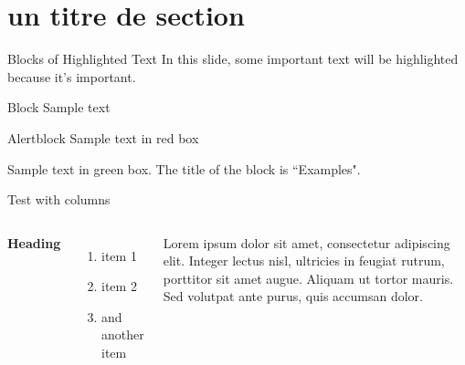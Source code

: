 \documentclass[aspectratio=169,xcolor=dvipsnames, t]{beamer}
\begin{document}
\section{un titre de section}
\begin{frame}{Blocks of Highlighted Text}
    In this slide, some important text will be \alert{highlighted} because it's important.
    \begin{block}{Block}
        Sample text
    \end{block}

    \begin{alertblock}{Alertblock}
        Sample text in red box
    \end{alertblock}

    \begin{examples}
        Sample text in green box. The title of the block is ``Examples".
    \end{examples}
\end{frame}

\begin{frame}[t]{Test with columns }
    \begin{columns}[c]

        \textbf{Heading}
        \begin{enumerate}
            \item item 1 
            \item item 2
            \item and another item
        \end{enumerate}

        Lorem ipsum dolor sit amet, consectetur adipiscing elit. Integer lectus nisl, ultricies in feugiat rutrum, porttitor sit amet augue. Aliquam ut tortor mauris. Sed volutpat ante purus, quis accumsan dolor.

    \end{columns}
\end{frame}
\end{document}
